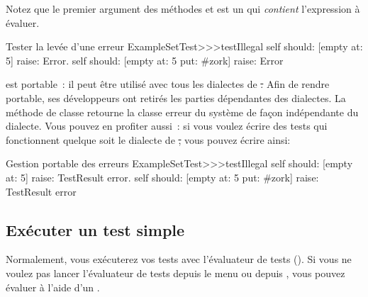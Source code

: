 \documentclass[a4paper,10pt,twoside]{book}
\begin{document}
Notez que le premier argument des méthodes  et  est un  qui \emph{contient}
l'expression à évaluer.

\begin{method}[ESTtestIllegal]{Tester la levée d'une erreur}
ExampleSetTest>>>testIllegal
	self should: [empty at: 5] raise: Error.
	self should: [empty at: 5 put: #zork] raise: Error
\end{method}

\sunit est portable~: il peut être utilisé avec tous les dialectes de \st. Afin de rendre \sunit portable, ses développeurs ont retirés les parties dépendantes des dialectes. La méthode de classe  retourne la classe erreur du système de façon indépendante du dialecte. Vous pouvez en profiter aussi~: si vous voulez écrire des tests qui fonctionnent quelque soit le dialecte de \st, vous pouvez écrire  ainsi:

\begin{method}[portabletestillegal]{Gestion portable des erreurs}
ExampleSetTest>>>testIllegal
	self should: [empty at: 5] raise: TestResult error.
	self should: [empty at: 5 put: #zork] raise: TestResult error
\end{method}


\subsection{Exécuter un test simple}
Normalement, vous exécuterez vos tests avec l'évaluateur de tests (). Si vous ne voulez pas lancer l'évaluateur de tests depuis le menu  ou depuis \toolsflap, vous pouvez évaluer   à l'aide d'un .
\end{document}

